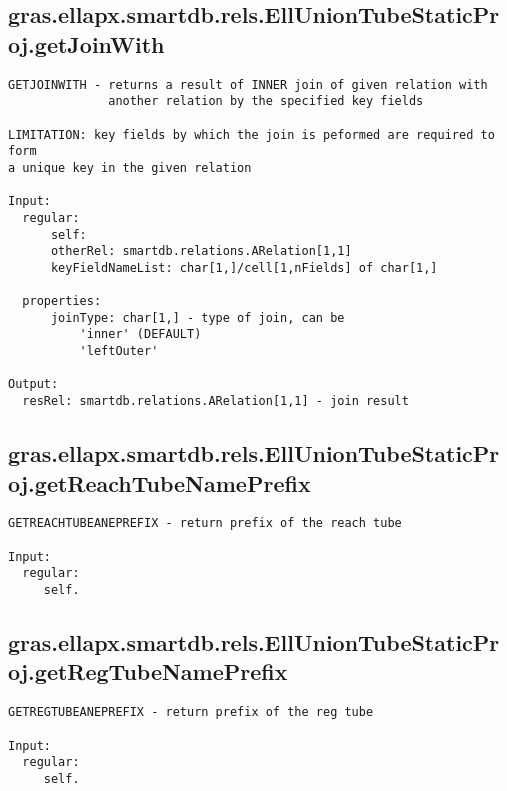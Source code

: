 \subsection{\texorpdfstring{gras.ellapx.smartdb.rels.EllUnionTubeStaticProj.getJoinWith}{getJoinWith}}\label{method:gras.ellapx.smartdb.rels.EllUnionTubeStaticProj.getJoinWith}
\begin{verbatim}
GETJOINWITH - returns a result of INNER join of given relation with
              another relation by the specified key fields

LIMITATION: key fields by which the join is peformed are required to form
a unique key in the given relation

Input:
  regular:
      self:
      otherRel: smartdb.relations.ARelation[1,1]
      keyFieldNameList: char[1,]/cell[1,nFields] of char[1,]

  properties:
      joinType: char[1,] - type of join, can be
          'inner' (DEFAULT)
          'leftOuter'

Output:
  resRel: smartdb.relations.ARelation[1,1] - join result
\end{verbatim}
\subsection{\texorpdfstring{gras.ellapx.smartdb.rels.EllUnionTubeStaticProj.getReachTubeNamePrefix}{getReachTubeNamePrefix}}\label{method:gras.ellapx.smartdb.rels.EllUnionTubeStaticProj.getReachTubeNamePrefix}
\begin{verbatim}
GETREACHTUBEANEPREFIX - return prefix of the reach tube

Input:
  regular:
     self.
\end{verbatim}
\subsection{\texorpdfstring{gras.ellapx.smartdb.rels.EllUnionTubeStaticProj.getRegTubeNamePrefix}{getRegTubeNamePrefix}}\label{method:gras.ellapx.smartdb.rels.EllUnionTubeStaticProj.getRegTubeNamePrefix}
\begin{verbatim}
GETREGTUBEANEPREFIX - return prefix of the reg tube

Input:
  regular:
     self.
\end{verbatim}
